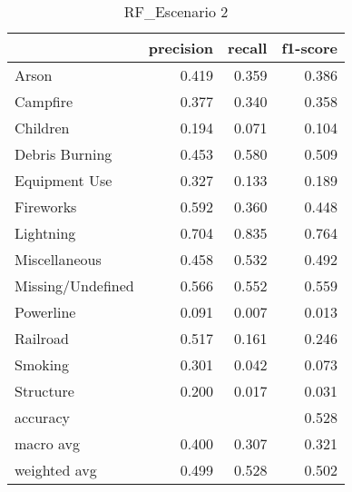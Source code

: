 \begin{table}
\centering
\caption{RF_Escenario 2}
\label{tab:Reporte de clasificación para el Escenario 2 utilizando Random Forest}
\begin{tabular}{lrrr}
\toprule
{} &  precision &  recall &  f1-score \\
\midrule
Arson             &      0.419 &   0.359 &     0.386 \\
Campfire          &      0.377 &   0.340 &     0.358 \\
Children          &      0.194 &   0.071 &     0.104 \\
Debris Burning    &      0.453 &   0.580 &     0.509 \\
Equipment Use     &      0.327 &   0.133 &     0.189 \\
Fireworks         &      0.592 &   0.360 &     0.448 \\
Lightning         &      0.704 &   0.835 &     0.764 \\
Miscellaneous     &      0.458 &   0.532 &     0.492 \\
Missing/Undefined &      0.566 &   0.552 &     0.559 \\
Powerline         &      0.091 &   0.007 &     0.013 \\
Railroad          &      0.517 &   0.161 &     0.246 \\
Smoking           &      0.301 &   0.042 &     0.073 \\
Structure         &      0.200 &   0.017 &     0.031 \\
accuracy          &            &         &     0.528 \\
macro avg         &      0.400 &   0.307 &     0.321 \\
weighted avg      &      0.499 &   0.528 &     0.502 \\
\bottomrule
\end{tabular}
\end{table}
